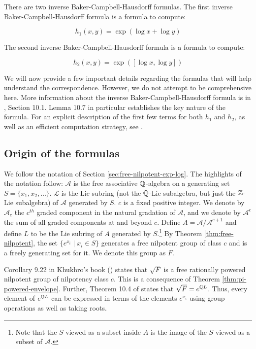 There are two inverse Baker-Campbell-Hausdorff formulas. The first
inverse Baker-Campbell-Hausdorff formula is a formula to compute:

$$h_1(x,y) = \exp(\log x + \log y)$$

The second inverse Baker-Campbell-Hausdorff formula is a formula to
compute:

$$h_2(x,y) =\exp([\log x, \log y])$$

We will now provide a few important details regarding the formulas
that will help understand the correspondence. However, we do not
attempt to be comprehensive here. More information about the inverse
Baker-Campbell-Hausdorff formula is in \cite{Khukhro}, Section
10.1. Lemma 10.7 in particular establishes the key nature of the
formula. For an explicit description of the first few terms for both
$h_1$ and $h_2$, as well as an efficient computation strategy, see
\cite{Lazardeffective}.


\subsection{Origin of the formulas}\label{sec:inverse-bch-origins}

We follow the notation of Section
\ref{sec:free-nilpotent-exp-log}. The highlights of the notation
follow: $\mathcal{A}$ is the free associative $\mathbb{Q}$-algebra on a
generating set $S = \{ x_1,x_2,\dots \}.$ $\mathcal{L}$ is the Lie
subring (not the $\mathbb{Q}$-Lie subalgebra, but just the $\mathbb{Z}$-Lie
subalgebra) of $\mathcal{A}$ generated by $S$. $c$ is a fixed positive
integer. We denote by $\mathcal{A}_c$ the $c^{th}$ graded component in
the natural gradation of $\mathcal{A}$, and we denote by
$\mathcal{A}^c$ the sum of all graded components at and beyond
$c$. Define $A = \mathcal{A}/\mathcal{A}^{c+1}$ and define $L$ to be
the Lie subring of $A$ generated by $S$.\footnote{Note that the $S$
  viewed as a subset inside $A$ is the image of the $S$ viewed as a
  subset of $\mathcal{A}$.} By Theorem \ref{thm:free-nilpotent}, the
set $\{ e^{x_i} \mid x_i \in S \}$ generates a free nilpotent group of
class $c$ and is a freely generating set for it. We denote this group
as $F$.

Corollary 9.22 in Khukhro's book (\cite{Khukhro}) states that
$\sqrt{F}$ is a free rationally powered nilpotent group of nilpotency
class $c$. This is a consequence of Theorem
\ref{thm:pi-powered-envelope}. Further, Theorem 10.4 of \cite{Khukhro}
states that $\sqrt{F} = e^{\mathbb{Q} L}$. Thus, every element of $e^{\mathbb{Q} L}$
can be expressed in terms of the elements $e^{x_i}$ using group
operations as well as taking roots.

